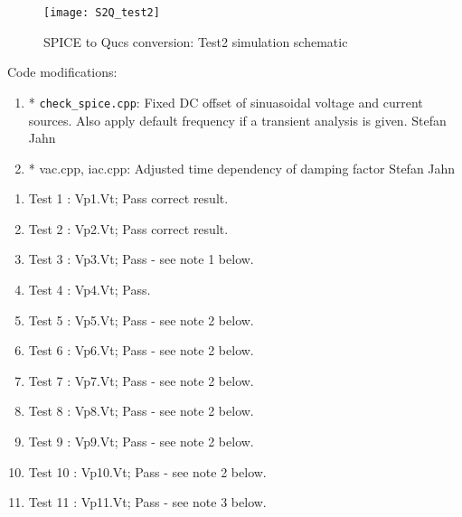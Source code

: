 \begin{figure}
  \centering
  \texttt{[image: S2Q\_test2]}
  \caption{SPICE to Qucs conversion: Test2 simulation schematic}
  \label{fig:S2Qtest2_3} 
\end{figure} 

Code modifications: 
\begin{enumerate}
 \item * \verb|check_spice.cpp|: Fixed DC offset of sinuasoidal voltage and
        current sources.  Also apply default frequency if a transient
        analysis is given. Stefan Jahn
\item * vac.cpp, iac.cpp: Adjusted time dependency of damping
        factor Stefan Jahn
\end{enumerate}

\begin{enumerate}
 \item Test 1  : Vp1.Vt;  Pass correct result.
 \item Test 2  : Vp2.Vt;  Pass correct result.
 \item Test 3  : Vp3.Vt;  Pass - see note 1 below.
 \item Test 4  : Vp4.Vt;  Pass.
 \item Test 5  : Vp5.Vt;  Pass - see note 2 below.
 \item Test 6  : Vp6.Vt;  Pass - see note 2 below.
 \item Test 7  : Vp7.Vt;  Pass - see note 2 below.
 \item Test 8  : Vp8.Vt;  Pass - see note 2 below.
 \item Test 9  : Vp9.Vt;  Pass - see note 2 below.
 \item Test 10 : Vp10.Vt; Pass - see note 2 below. 
 \item Test 11 : Vp11.Vt; Pass - see note 3 below. 
\end{enumerate}

